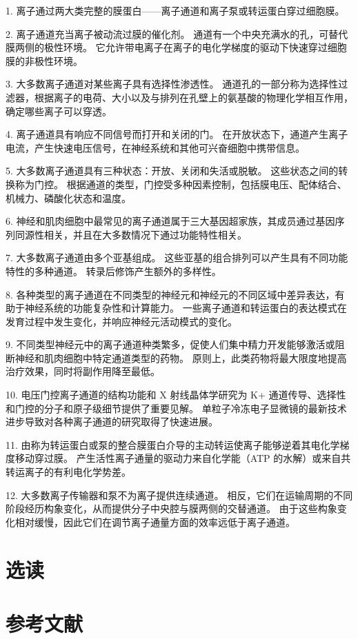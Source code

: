 1. 离子通过两大类完整的膜蛋白——离子通道和离子泵或转运蛋白穿过细胞膜。 


2. 离子通道充当离子被动流过膜的催化剂。 
通道有一个中央充满水的孔，可替代膜两侧的极性环境。 
它允许带电离子在离子的电化学梯度的驱动下快速穿过细胞膜的非极性环境。 


3. 大多数离子通道对某些离子具有选择性渗透性。 
通道孔的一部分称为选择性过滤器，根据离子的电荷、大小以及与排列在孔壁上的氨基酸的物理化学相互作用，确定哪些离子可以穿透。 


4. 离子通道具有响应不同信号而打开和关闭的门。 
在开放状态下，通道产生离子电流，产生快速电压信号，在神经系统和其他可兴奋细胞中携带信息。 


5. 大多数离子通道具有三种状态：开放、关闭和失活或脱敏。 
这些状态之间的转换称为门控。 
根据通道的类型，门控受多种因素控制，包括膜电压、配体结合、机械力、磷酸化状态和温度。 


6. 神经和肌肉细胞中最常见的离子通道属于三大基因超家族，其成员通过基因序列同源性相关，并且在大多数情况下通过功能特性相关。 


7. 大多数离子通道由多个亚基组成。 
这些亚基的组合排列可以产生具有不同功能特性的多种通道。 转录后修饰产生额外的多样性。 


8. 各种类型的离子通道在不同类型的神经元和神经元的不同区域中差异表达，有助于神经系统的功能复杂性和计算能力。 
一些离子通道和转运蛋白的表达模式在发育过程中发生变化，并响应神经元活动模式的变化。 


9. 不同类型神经元中的离子通道种类繁多，促使人们集中精力开发能够激活或阻断神经和肌肉细胞中特定通道类型的药物。 
原则上，此类药物将最大限度地提高治疗效果，同时将副作用降至最低。 


10. 电压门控离子通道的结构功能和 X 射线晶体学研究为 K+ 通道传导、选择性和门控的分子和原子级细节提供了重要见解。 
单粒子冷冻电子显微镜的最新技术进步导致对各种离子通道的研究取得了快速进展。 


11. 由称为转运蛋白或泵的整合膜蛋白介导的主动转运使离子能够逆着其电化学梯度移动穿过膜。 
产生活性离子通量的驱动力来自化学能（ATP 的水解）或来自共转运离子的有利电化学势差。 


12. 大多数离子传输器和泵不为离子提供连续通道。 
相反，它们在运输周期的不同阶段经历构象变化，从而提供分子中央腔与膜两侧的交替通道。 
由于这些构象变化相对缓慢，因此它们在调节离子通量方面的效率远低于离子通道。


\section{选读}

\section{参考文献}
